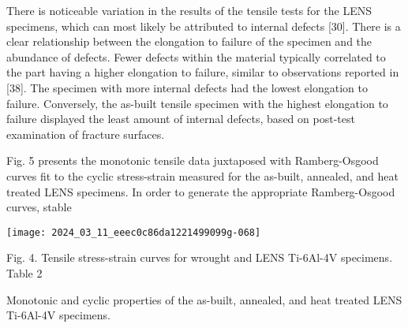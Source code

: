 \documentclass[10pt]{article}
\begin{document}
There is noticeable variation in the results of the tensile tests for the LENS specimens, which can most likely be attributed to internal defects [30]. There is a clear relationship between the elongation to failure of the specimen and the abundance of defects. Fewer defects within the material typically correlated to the part having a higher elongation to failure, similar to observations reported in [38]. The specimen with more internal defects had the lowest elongation to failure. Conversely, the as-built tensile specimen with the highest elongation to failure displayed the least amount of internal defects, based on post-test examination of fracture surfaces.

Fig. 5 presents the monotonic tensile data juxtaposed with Ramberg-Osgood curves fit to the cyclic stress-strain measured for the as-built, annealed, and heat treated LENS specimens. In order to generate the appropriate Ramberg-Osgood curves, stable

\begin{center}
\texttt{[image: 2024\_03\_11\_eeec0c86da1221499099g-068]}
\end{center}

Fig. 4. Tensile stress-strain curves for wrought and LENS Ti-6Al-4V specimens.\\
Table 2

Monotonic and cyclic properties of the as-built, annealed, and heat treated LENS Ti-6Al-4V specimens.
\end{document}
